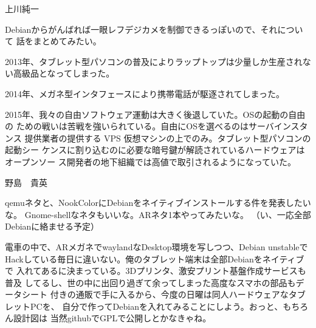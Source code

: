 \begin{prework}{上川純一}


Debianからがんばれば一眼レフデジカメを制御できるっぽいので、それについて
話をまとめてみたい。


2013年、タブレット型パソコンの普及によりラップトップは少量しか生産されな
 い高級品となってしまった。

2014年、メガネ型インタフェースにより携帯電話が駆逐されてしまった。

2015年、我々の自由ソフトウェア運動は大きく後退していた。OSの起動の自由の
ための戦いは苦戦を強いられている。自由にOSを選べるのはサーバインスタンス
提供業者の提供する VPS 仮想マシンの上でのみ。タブレット型パソコンの起動シー
ケンスに割り込むのに必要な暗号鍵が解読されているハードウェアはオープンソー
ス開発者の地下組織では高値で取引されるようになっていた。

\end{prework}

\begin{prework}{ 野島　貴英 }


 qemuネタと、NookColorにDebianをネイティブインストールする件を発表したいな。
Gnome-shellなネタもいいな。ARネタ1本やってみたいな。
（い、一応全部Debianに絡ませる予定）


 電車の中で、ARメガネでwaylandなDesktop環境を写しつつ、Debian unstableで
Hackしている毎日に違いない。俺のタブレット端末は全部Debianをネイティブで
入れてあるに決まっている。3Dプリンタ、激安プリント基盤作成サービスも普及
してるし、世の中に出回り過ぎて余ってしまった高度なスマホの部品もデータシート
付きの通販で手に入るから、今度の日曜は同人ハードウェアなタブレットPCを、
自分で作ってDebianを入れてみることにしよう。おっと、もちろん設計図は
当然githubでGPLで公開しとかなきゃね。

\end{prework}
